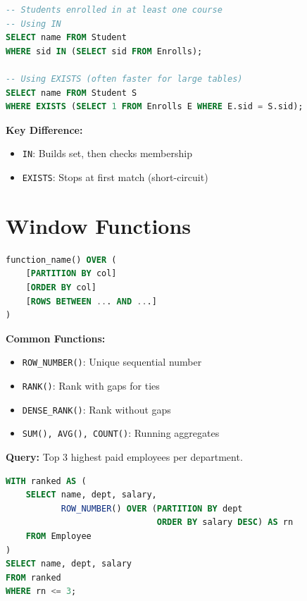 \begin{examplebox}[EXISTS vs IN]
\begin{lstlisting}[language=SQL]
-- Students enrolled in at least one course
-- Using IN
SELECT name FROM Student
WHERE sid IN (SELECT sid FROM Enrolls);

-- Using EXISTS (often faster for large tables)
SELECT name FROM Student S
WHERE EXISTS (SELECT 1 FROM Enrolls E WHERE E.sid = S.sid);
\end{lstlisting}

\textbf{Key Difference:}
\begin{itemize}
    \item \texttt{IN}: Builds set, then checks membership
    \item \texttt{EXISTS}: Stops at first match (short-circuit)
\end{itemize}
\end{examplebox}

\section{Window Functions}

\begin{formulabox}
\begin{lstlisting}[language=SQL]
function_name() OVER (
    [PARTITION BY col]
    [ORDER BY col]
    [ROWS BETWEEN ... AND ...]
)
\end{lstlisting}

\textbf{Common Functions:}
\begin{itemize}
    \item \texttt{ROW\_NUMBER()}: Unique sequential number
    \item \texttt{RANK()}: Rank with gaps for ties
    \item \texttt{DENSE\_RANK()}: Rank without gaps
    \item \texttt{SUM(), AVG(), COUNT()}: Running aggregates
\end{itemize}
\end{formulabox}

\begin{examplebox}
\textbf{Query:} Top 3 highest paid employees per department.

\begin{lstlisting}[language=SQL]
WITH ranked AS (
    SELECT name, dept, salary,
           ROW_NUMBER() OVER (PARTITION BY dept
                              ORDER BY salary DESC) AS rn
    FROM Employee
)
SELECT name, dept, salary
FROM ranked
WHERE rn <= 3;
\end{lstlisting}
\end{examplebox}

